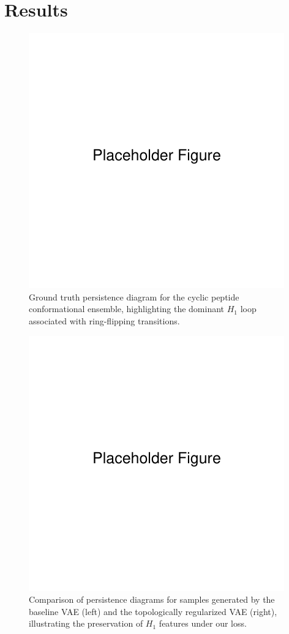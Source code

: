 \documentclass[11pt]{article}
\begin{document}
\section{Results}
\begin{figure}[t]
    \centering
    \includegraphics[width=0.75\linewidth]{figures/placeholder.pdf}
    \caption{Ground truth persistence diagram for the cyclic peptide conformational ensemble, highlighting the dominant $H_1$ loop associated with ring-flipping transitions.}
    \label{fig:groundtruth_pd}
\end{figure}

\begin{figure}[t]
    \centering
    \includegraphics[width=0.75\linewidth]{figures/placeholder.pdf}
    \caption{Comparison of persistence diagrams for samples generated by the baseline VAE (left) and the topologically regularized VAE (right), illustrating the preservation of $H_1$ features under our loss.}
    \label{fig:generated_pds}
\end{figure}
\end{document}
